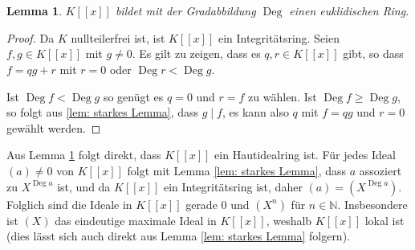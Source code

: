 \documentclass[a4paper,10pt]{article}
\newcounter{satze}
\newtheorem{lem}[satze]{Lemma}
\theoremstyle{definition}
\newcommand{\N}{\mathbb{N}}
\newcommand{\Deg}{\operatorname{Deg}}
\begin{document}
\section{}
\begin{lem}\label{lem: K[[x]] euklidisch}
 $K[\![x]\!]$ bildet mit der Gradabbildung $\Deg$ einen euklidischen Ring.
\end{lem}
\begin{proof}
 Da $K$ nullteilerfrei ist, ist $K[\![x]\!]$ ein Integritätsring. Seien $f,g \in K[\![x]\!]$ mit $g \neq 0$. Es gilt zu zeigen, dass es $q,r \in K[\![x]\!]$ gibt, so dass $f = qg + r$ mit $r = 0$ oder $\Deg r < \Deg g$.
 
 Ist $\Deg f < \Deg g$ so genügt es $q=0$ und $r=f$ zu wählen. Ist $\Deg f \geq \Deg g$, so folgt aus \ref{lem: starkes Lemma}, dass $g \mid f$, es kann also $q$ mit $f = qg$ und $r=0$ gewählt werden.
\end{proof}

Aus Lemma \ref{lem: K[[x]] euklidisch} folgt direkt, dass $K[\![x]\!]$ ein Hautidealring ist. Für jedes Ideal $(a) \neq 0$ von $K[\![x]\!]$ folgt mit Lemma \ref{lem: starkes Lemma}, dass $a$ assoziert zu $X^{\Deg a}$ ist, und da $K[\![x]\!]$ ein Integritätsring ist, daher $(a) = \left(X^{\Deg a}\right)$. Folglich sind die Ideale in $K[\![x]\!]$ gerade $0$ und $\left(X^n\right)$ für $n \in \N$. Insbesondere ist $(X)$ das eindeutige maximale Ideal in $K[\![x]\!]$, weshalb $K[\![x]\!]$ lokal ist (dies lässt sich auch direkt aus Lemma \ref{lem: starkes Lemma} folgern).
\end{document}
